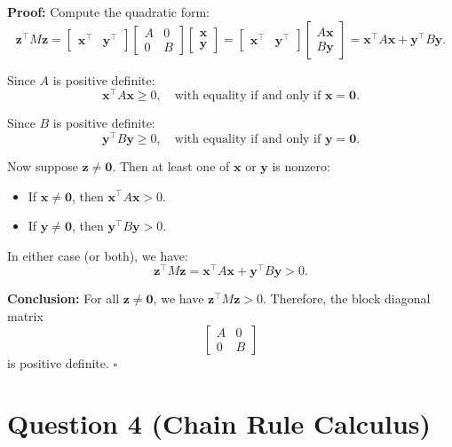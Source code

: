 \documentclass{article}
\begin{document}
\textbf{Proof:} Compute the quadratic form:
\[
\mathbf{z}^\top M \mathbf{z}
=
\begin{bmatrix}
\mathbf{x}^\top & \mathbf{y}^\top
\end{bmatrix}
\begin{bmatrix}
A & 0 \\
0 & B
\end{bmatrix}
\begin{bmatrix}
\mathbf{x} \\
\mathbf{y}
\end{bmatrix}
=
\begin{bmatrix}
\mathbf{x}^\top & \mathbf{y}^\top
\end{bmatrix}
\begin{bmatrix}
A\mathbf{x} \\
B\mathbf{y}
\end{bmatrix}
=
\mathbf{x}^\top A \mathbf{x} + \mathbf{y}^\top B \mathbf{y}.
\]

Since $A$ is positive definite:
\[
\mathbf{x}^\top A \mathbf{x} \geq 0, \quad \text{with equality if and only if } \mathbf{x} = \mathbf{0}.
\]

Since $B$ is positive definite:
\[
\mathbf{y}^\top B \mathbf{y} \geq 0, \quad \text{with equality if and only if } \mathbf{y} = \mathbf{0}.
\]

Now suppose $\mathbf{z} \neq \mathbf{0}$. Then at least one of $\mathbf{x}$ or $\mathbf{y}$ is nonzero:
\begin{itemize}
    \item If $\mathbf{x} \neq \mathbf{0}$, then $\mathbf{x}^\top A \mathbf{x} > 0$.
    \item If $\mathbf{y} \neq \mathbf{0}$, then $\mathbf{y}^\top B \mathbf{y} > 0$.
\end{itemize}

In either case (or both), we have:
\[
\mathbf{z}^\top M \mathbf{z} = \mathbf{x}^\top A \mathbf{x} + \mathbf{y}^\top B \mathbf{y} > 0.
\]

\textbf{Conclusion:} For all $\mathbf{z} \neq \mathbf{0}$, we have $\mathbf{z}^\top M \mathbf{z} > 0$. Therefore, the block diagonal matrix
\[
\begin{bmatrix}
A & 0 \\
0 & B
\end{bmatrix}
\]
is positive definite. \hfill $\square$

\newpage
\section*{Question 4 (Chain Rule Calculus)}
\end{document}
